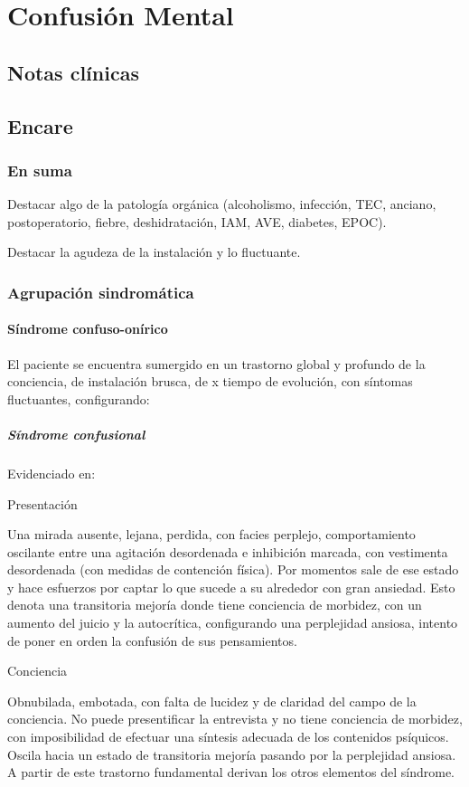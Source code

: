 \chapter{Confusión Mental}
\section*{Notas clínicas}
\section*{Encare}
\subsection*{En suma}
Destacar algo de la patología orgánica (alcoholismo, infección, TEC, anciano, postoperatorio, fiebre, deshidratación, IAM, AVE, diabetes, EPOC).

Destacar la agudeza de la instalación y lo fluctuante.

\subsection*{Agrupación sindromática}
\subsubsection*{Síndrome confuso-onírico}

El paciente se encuentra sumergido en un trastorno global y profundo de la conciencia, de instalación brusca, de x tiempo de evolución, con síntomas fluctuantes, configurando:

\paragraph{Síndrome confusional}
Evidenciado en:

Presentación

Una mirada ausente, lejana, perdida, con facies perplejo, comportamiento oscilante entre una agitación desordenada e inhibición marcada, con vestimenta desordenada (con medidas de contención física). Por momentos sale de ese estado y hace esfuerzos por captar lo que sucede a su alrededor con gran ansiedad. Esto denota una transitoria mejoría donde tiene conciencia de morbidez, con un aumento del juicio y la autocrítica, configurando una perplejidad ansiosa, intento de poner en orden la confusión de sus pensamientos.

Conciencia

Obnubilada, embotada, con falta de lucidez y de claridad del campo de la conciencia. No puede presentificar la entrevista y no tiene conciencia de morbidez, con imposibilidad de efectuar una síntesis adecuada de los contenidos psíquicos. Oscila hacia un estado de transitoria mejoría pasando por la perplejidad ansiosa. A partir de este trastorno fundamental derivan los otros elementos del síndrome.


